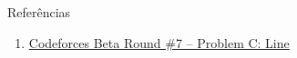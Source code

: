 \begin{frame}[fragile]{Referências}

    \begin{enumerate}
        \item \href{https://codeforces.com/problemset/problem/7/C}{Codeforces Beta Round \#7 -- Problem C: Line}

    \end{enumerate}

\end{frame}
